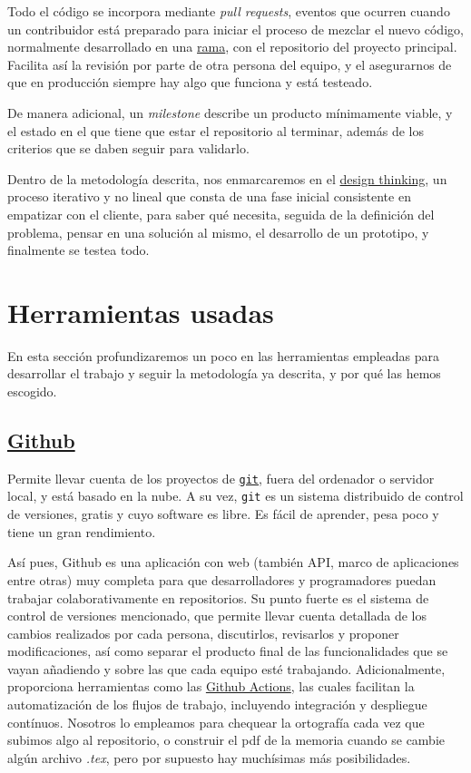 Todo el código se incorpora mediante \textit{pull requests}, eventos que ocurren cuando un contribuidor está 
preparado para iniciar el proceso de mezclar el nuevo código, normalmente desarrollado en una \href{https://docs.github.com/github/collaborating-with-issues-and-pull-requests/about-branches}{rama}, 
con el repositorio del proyecto principal. Facilita así la revisión por parte de otra persona del equipo, y el 
asegurarnos de que en producción siempre hay algo que funciona y está testeado.

De manera adicional, un \textit{milestone} describe un producto mínimamente viable, y el estado en el que tiene 
que estar el repositorio al terminar, además de los criterios que se daben seguir 
para validarlo.

Dentro de la metodología descrita, nos enmarcaremos en el \href{https://www.iebschool.com/blog/design-thinking-agile-scrum/}{design thinking}, 
un proceso iterativo y no lineal que consta de una fase inicial consistente en empatizar con el 
cliente, para saber qué necesita, seguida de la definición del problema, pensar en una solución al 
mismo, el desarrollo de un prototipo, y finalmente se testea todo. 

\section{Herramientas usadas}
En esta sección profundizaremos un poco en las herramientas empleadas para desarrollar el trabajo y seguir 
la metodología ya descrita, y por qué las hemos escogido.

\subsection{\href{https://github.com/}{Github}} 

Permite llevar cuenta de los proyectos de \href{https://git-scm.com/}{\tt git}, fuera del ordenador o 
servidor local, y está basado en la nube. A su vez, {\tt git} es un 
sistema distribuido de control de versiones, gratis y cuyo software es libre. Es fácil de 
aprender, pesa poco y tiene un gran rendimiento.

Así pues, Github es una aplicación con web (también API, marco de aplicaciones entre otras) muy completa para que desarrolladores y programadores puedan trabajar colaborativamente 
en repositorios. Su punto fuerte es el sistema de control de versiones mencionado, que permite llevar cuenta detallada 
de los cambios realizados por cada persona, discutirlos, revisarlos y proponer modificaciones, así como 
separar el producto final de las funcionalidades que se vayan añadiendo y sobre las que cada equipo esté 
trabajando. Adicionalmente, proporciona herramientas como las \href{https://github.com/features/actions}{Github Actions}, 
las cuales facilitan la automatización de los flujos de trabajo, incluyendo integración y despliegue contínuos.
Nosotros lo empleamos para chequear la ortografía cada vez que subimos algo al repositorio, o construir el pdf 
de la memoria cuando se cambie algún archivo \textit{.tex}, pero por supuesto hay muchísimas más posibilidades.

